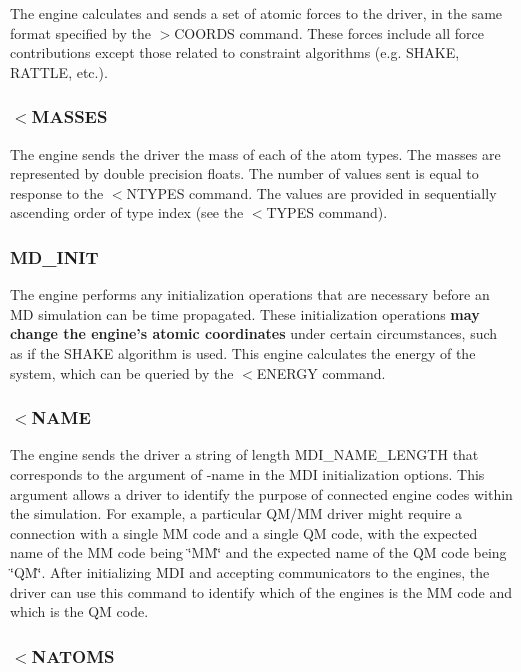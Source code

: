 The engine calculates and sends a set of atomic forces to the driver, in the same format specified by the {\ttfamily $>$C\-O\-O\-R\-D\-S} command. These forces include all force contributions except those related to constraint algorithms (e.\-g. S\-H\-A\-K\-E, R\-A\-T\-T\-L\-E, etc.).\hypertarget{index_recv_masses}{}\subsubsection{$<$\-M\-A\-S\-S\-E\-S}\label{index_recv_masses}
The engine sends the driver the mass of each of the atom types. The masses are represented by double precision floats. The number of values sent is equal to response to the $<$N\-T\-Y\-P\-E\-S command. The values are provided in sequentially ascending order of type index (see the {\ttfamily $<$T\-Y\-P\-E\-S} command).\hypertarget{index_md_init}{}\subsubsection{M\-D\-\_\-\-I\-N\-I\-T}\label{index_md_init}
The engine performs any initialization operations that are necessary before an M\-D simulation can be time propagated. These initialization operations {\bfseries  may change the engine's atomic coordinates } under certain circumstances, such as if the S\-H\-A\-K\-E algorithm is used. This engine calculates the energy of the system, which can be queried by the {\ttfamily $<$E\-N\-E\-R\-G\-Y} command.\hypertarget{index_send_name}{}\subsubsection{$<$\-N\-A\-M\-E}\label{index_send_name}
The engine sends the driver a string of length {\ttfamily M\-D\-I\-\_\-\-N\-A\-M\-E\-\_\-\-L\-E\-N\-G\-T\-H} that corresponds to the argument of {\ttfamily -\/name} in the M\-D\-I initialization options. This argument allows a driver to identify the purpose of connected engine codes within the simulation. For example, a particular Q\-M/\-M\-M driver might require a connection with a single M\-M code and a single Q\-M code, with the expected name of the M\-M code being \char`\"{}\-M\-M\char`\"{} and the expected name of the Q\-M code being \char`\"{}\-Q\-M\char`\"{}. After initializing M\-D\-I and accepting communicators to the engines, the driver can use this command to identify which of the engines is the M\-M code and which is the Q\-M code.\hypertarget{index_recv_natoms}{}\subsubsection{$<$\-N\-A\-T\-O\-M\-S}\label{index_recv_natoms}

